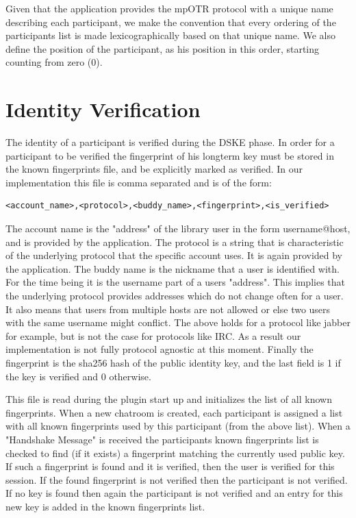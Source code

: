 \documentclass[12pt,titlepage,a4paper]{article}
\begin{document}
Given that the application provides the mpOTR protocol with a unique name describing each participant, we make the convention that every ordering of the participants list is made lexicographically based on that unique name. We also define the position of the participant, as his position in this order, starting counting from zero (0).

\section{Identity Verification}
The identity of a participant is verified during the DSKE phase.
In order for a participant to be verified the fingerprint of his longterm key must be stored in the known fingerprints file, and be explicitly marked as verified.
In our implementation this file is comma separated and is of the form:

\begin{verbatim}
<account_name>,<protocol>,<buddy_name>,<fingerprint>,<is_verified>
\end{verbatim}

The account name is the "address" of the library user in the form username@host, and is provided by the application.
The protocol is a string that is characteristic of the underlying protocol that the specific account uses.
It is again provided by the application.
The buddy name is the nickname that a user is identified with.
For the time being it is the username part of a users "address".
This implies that the underlying protocol provides addresses which do not change often for a user.
It also means that users from multiple hosts are not allowed or else two users with the same username might conflict.
The above holds for a protocol like jabber for example, but is not the case for protocols like IRC.
As a result our implementation is not fully protocol agnostic at this moment.
Finally the fingerprint is the sha256 hash of the public identity key, and the last field is 1 if the key is verified and 0 otherwise.

This file is read during the plugin start up and initializes the list of all known fingerprints.
When a new chatroom is created, each participant is assigned a list with all known fingerprints used by this participant (from the above list).
When a "Handshake Message" is received the participants known fingerprints list is checked to find (if it exists) a fingerprint matching the currently used public key.
If such a fingerprint is found and it is verified, then the user is verified for this session.
If the found fingerprint is not verified then the participant is not verified.
If no key is found then again the participant is not verified and an entry for this new key is added in the known fingerprints list.
\end{document}
